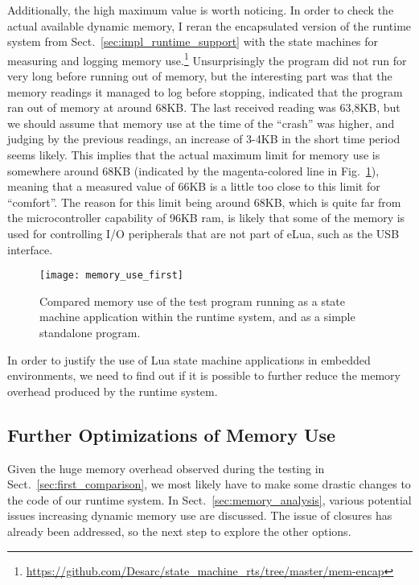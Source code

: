 \noindent
Additionally, the high maximum value is worth noticing. In order to check the actual available dynamic memory, I reran the encapsulated version of the runtime system from Sect.~\ref{sec:impl_runtime_support} with the state machines for measuring and logging memory use.\footnote{\url{https://github.com/Desarc/state_machine_rts/tree/master/mem-encap}} Unsurprisingly the program did not run for very long before running out of memory, but the interesting part was that the memory readings it managed to log before stopping, indicated that the program ran out of memory at around 68KB. The last received reading was 63,8KB, but we should assume that memory use at the time of the ``crash'' was higher, and judging by the previous readings, an increase of 3-4KB in the short time period seems likely. This implies that the actual maximum limit for memory use is somewhere around 68KB (indicated by the magenta-colored line in Fig.~\ref{fig:memory_use_first}), meaning that a measured value of 66KB is a little too close to this limit for ``comfort''. The reason for this limit being around 68KB, which is quite far from the microcontroller capability of 96KB \gls{ram}, is likely that some of the memory is used for controlling I/O peripherals that are not part of eLua, such as the USB interface.

\begin{figure}[htp]
	\centering
	\texttt{[image: memory\_use\_first]}
	\caption[Results of first memory overhead test]{Compared memory use of the test program running as a state machine application within the runtime system, and as a simple standalone program.}
	\label{fig:memory_use_first}
\end{figure}

\noindent
In order to justify the use of Lua state machine applications in embedded environments, we need to find out if it is possible to further reduce the memory overhead produced by the runtime system.

\subsection{Further Optimizations of Memory Use}
\label{sec:more_optimization}
Given the huge memory overhead observed during the testing in Sect.~\ref{sec:first_comparison}, we most likely have to make some drastic changes to the code of our runtime system. In Sect.~\ref{sec:memory_analysis}, various potential issues increasing dynamic memory use are discussed. The issue of closures has already been addressed, so the next step to explore the other options.

